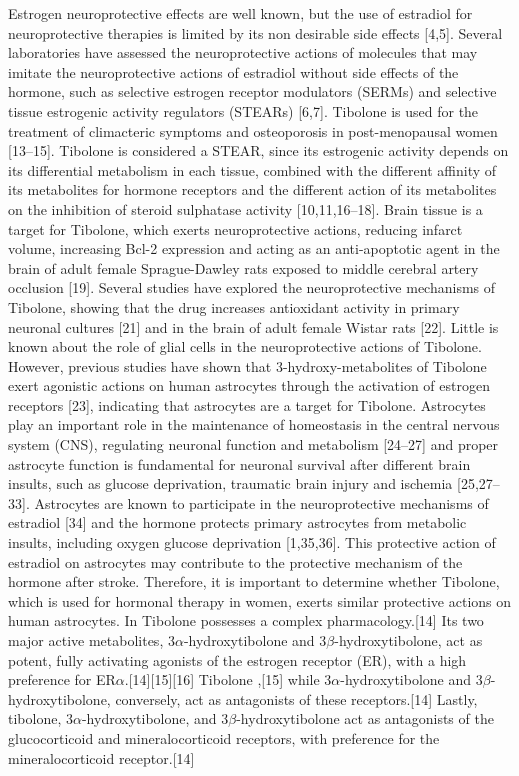 Estrogen neuroprotective effects are well known, but the use of estradiol for neuroprotective therapies is limited by its non desirable side effects [4,5]. 
Several laboratories have assessed the neuroprotective actions of molecules that may imitate the neuroprotective actions of estradiol without side effects of the hormone, such as selective estrogen receptor modulators (SERMs) and selective tissue estrogenic activity regulators (STEARs) [6,7]. Tibolone is used for the treatment of climacteric symptoms and osteoporosis in post-menopausal women [13–15]. Tibolone is considered a STEAR, since its estrogenic activity depends on its differential metabolism in each tissue, combined with the different affinity of its metabolites for hormone receptors and the different action of its metabolites on the inhibition of steroid sulphatase activity [10,11,16–18].
Brain tissue is a target for Tibolone, which exerts neuroprotective actions, reducing infarct volume, increasing Bcl-2 expression and acting as an anti-apoptotic agent in the brain of adult female Sprague-Dawley rats exposed to middle cerebral artery occlusion [19]. Several studies have explored the neuroprotective mechanisms of Tibolone, showing that the drug increases antioxidant activity in primary neuronal cultures [21] and in the brain of adult female Wistar rats [22].
Little is known about the role of glial cells in the neuroprotective actions of Tibolone. However, previous studies have shown that 3-hydroxy-metabolites of Tibolone exert agonistic actions on human astrocytes through the activation of estrogen receptors [23], indicating that astrocytes are a target for Tibolone. Astrocytes play an important role in the maintenance of homeostasis in the central nervous system (CNS), regulating neuronal function and metabolism [24–27] and proper astrocyte function is fundamental for neuronal survival after different brain insults, such as glucose deprivation, traumatic brain injury and ischemia [25,27–33]. Astrocytes are known to participate in the neuroprotective mechanisms of estradiol [34] and the hormone protects primary astrocytes from metabolic insults, including oxygen glucose deprivation [1,35,36]. This protective action of estradiol on astrocytes may contribute to the protective mechanism of the hormone after stroke. Therefore, it is important to determine whether Tibolone, which is used for hormonal therapy in women, exerts similar protective actions on human astrocytes. In
 Tibolone possesses a complex pharmacology.[14] Its two major active metabolites, 3$\alpha$-hydroxytibolone and 3$\beta$-hydroxytibolone, act as potent, fully activating agonists of the estrogen receptor (ER), with a high preference for ER$\alpha$.[14][15][16] Tibolone ,[15] while 3$\alpha$-hydroxytibolone and 3$\beta$-hydroxytibolone, conversely, act as antagonists of these receptors.[14] Lastly, tibolone, 3$\alpha$-hydroxytibolone, and 3$\beta$-hydroxytibolone act as antagonists of the glucocorticoid and mineralocorticoid receptors, with preference for the mineralocorticoid receptor.[14]

